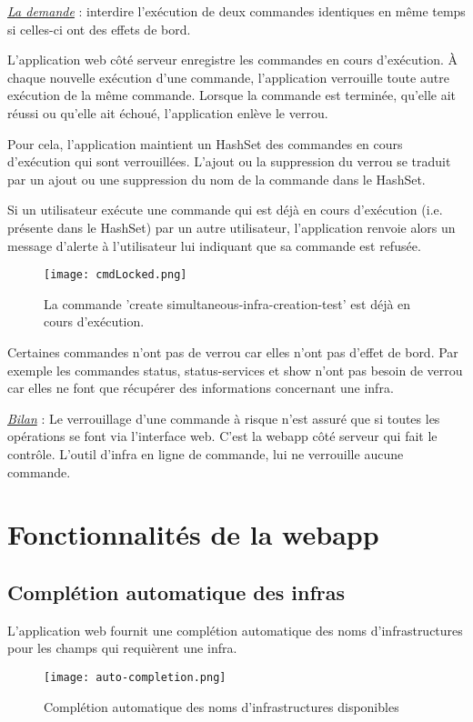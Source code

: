 \underline{\textit{La demande}} : interdire l'exécution de deux commandes
identiques en même temps si celles-ci ont des effets de bord.

L'application web côté serveur enregistre les commandes en cours d'exécution.
À chaque nouvelle exécution d'une commande, l'application verrouille toute autre
exécution de la même commande. Lorsque la commande est terminée, qu'elle ait
réussi ou qu'elle ait échoué, l'application enlève le verrou.

Pour cela, l'application maintient un HashSet des commandes en cours d'exécution
qui sont verrouillées. L'ajout ou la suppression du verrou se traduit par un
ajout ou une suppression du nom de la commande dans le HashSet.

Si un utilisateur exécute une commande qui est déjà en cours d'exécution
(i.e. présente dans le HashSet) par un autre utilisateur, l'application renvoie
alors un message d'alerte à l'utilisateur lui indiquant que sa commande est refusée.

\begin{figure}[H]
  \texttt{[image: cmdLocked.png]}
  \caption{La commande 'create simultaneous-infra-creation-test' est déjà en
    cours d'exécution.}
\end{figure}

Certaines commandes n'ont pas de verrou car elles n'ont pas d'effet de bord.
Par exemple les commandes status, status-services et show n'ont pas besoin
de verrou car elles ne font que récupérer des informations concernant une infra.

\underline{\textit{Bilan}} : Le verrouillage d'une commande à risque n'est
assuré que si toutes les opérations se font via l'interface web. C'est la webapp
côté serveur qui fait le contrôle. L'outil d'infra en ligne de commande, lui ne
verrouille aucune commande.

\section{Fonctionnalités de la webapp}

\subsection{Complétion automatique des infras}

L'application web fournit une complétion automatique des noms d'infrastructures
pour les champs qui requièrent une infra.

\begin{figure}[H]
  \texttt{[image: auto-completion.png]}
  \caption{Complétion automatique des noms d'infrastructures disponibles}
\end{figure}

